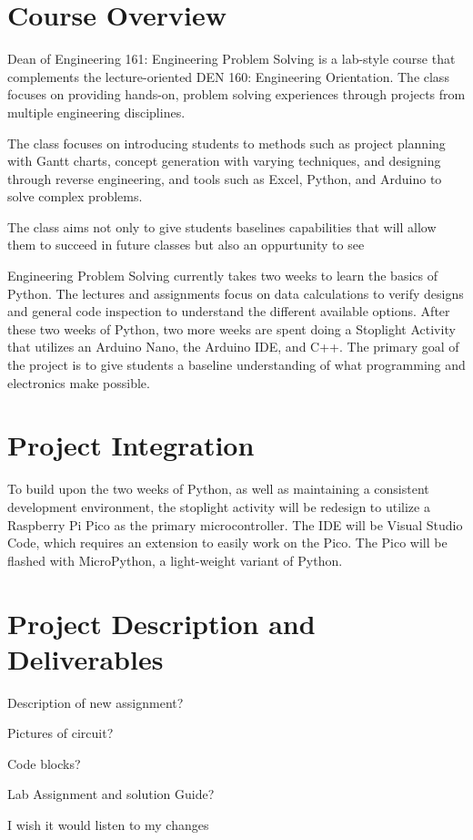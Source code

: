 \section{Course Overview}
Dean of Engineering 161: Engineering Problem Solving is a lab-style
course that complements the lecture-oriented DEN 160: Engineering
Orientation. The class focuses on providing hands-on, problem
solving experiences through projects from multiple engineering 
disciplines. 

The class focuses on introducing students to methods such as project
planning with Gantt charts, concept generation with varying 
techniques, and designing through reverse engineering, and tools 
such as Excel, Python, and Arduino to solve complex problems. 

The class aims not only to give students baselines capabilities that 
will allow them to succeed in future classes but also an oppurtunity 
to see 

Engineering Problem Solving currently takes two weeks to learn the 
basics of Python. The lectures and assignments focus on data
calculations to verify designs and general code inspection to 
understand the different available options. After these two weeks 
of Python, two more weeks are spent doing a Stoplight Activity that 
utilizes an Arduino Nano, the Arduino IDE, and C++. The primary goal 
of the project is to give students a baseline understanding of what 
programming and electronics make possible.

\section{Project Integration}
To build upon the two weeks of Python, as well as maintaining a 
consistent development environment, the stoplight activity will be 
redesign to utilize a Raspberry Pi Pico as the primary microcontroller. The IDE will be Visual Studio Code, which requires an extension to easily work on the Pico. The Pico will be flashed with MicroPython, a light-weight variant of Python.

\section{Project Description and Deliverables}
Description of new assignment?

Pictures of circuit?

Code blocks?

Lab Assignment and solution Guide?

I wish it would listen to my changes